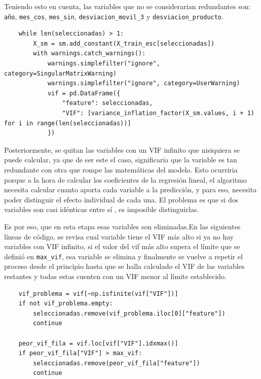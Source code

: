 Teniendo esto en cuenta, las variables que no se considerarian redundantes son: \texttt{año}, \texttt{mes\_cos}, \texttt{mes\_sin}, \texttt{desviacion\_movil\_3} y \texttt{desviacion\_producto}.

\label{lst:regresion_vif}
\begin{verbatim}
    while len(seleccionadas) > 1:
        X_sm = sm.add_constant(X_train_esc[seleccionadas])
        with warnings.catch_warnings():
            warnings.simplefilter("ignore", category=SingularMatrixWarning)
            warnings.simplefilter("ignore", category=UserWarning)
            vif = pd.DataFrame({
                "feature": seleccionadas,
                "VIF": [variance_inflation_factor(X_sm.values, i + 1) for i in range(len(seleccionadas))]
            })
\end{verbatim}

Posteriormente, se quitan las variables con un VIF infinito que nisiquiera se puede calcular, ya que de ser este el caso, significaria que la variable es tan redundante con otra que rompe las matemáticas del modelo. Esto ocurriria porque a la hora de calcular los coeficientes de la regresión lineal, el algoritmo necesita calcular cuanto aporta cada variable a la predicción, y para eso, necesita poder distinguir el efecto individual de cada una. El problema es que si dos variables son casi idénticas entre sí , es imposible distinguirlas.

Es por eso, que en esta etapa esas variables son eliminadas.En las siguientes líneas de código, se revisa cual variable tiene el VIF más alto si ya no hay variables con VIF infinito, si el valor del vif más alto supera el límite que se definió en \texttt{max\_vif}, esa variable se elimina y finalmente se vuelve a repetir el proceso desde el principio hasta que se halla calculado el VIF de las variables restantes y todas estas cuenten con un VIF menor al límite establecido.

\label{lst:regresion_eliminacion_vif}
\begin{verbatim}
    vif_problema = vif[~np.isfinite(vif["VIF"])]
    if not vif_problema.empty:
        seleccionadas.remove(vif_problema.iloc[0]["feature"])
        continue

    peor_vif_fila = vif.loc[vif["VIF"].idxmax()]
    if peor_vif_fila["VIF"] > max_vif:
        seleccionadas.remove(peor_vif_fila["feature"])
        continue
\end{verbatim}


